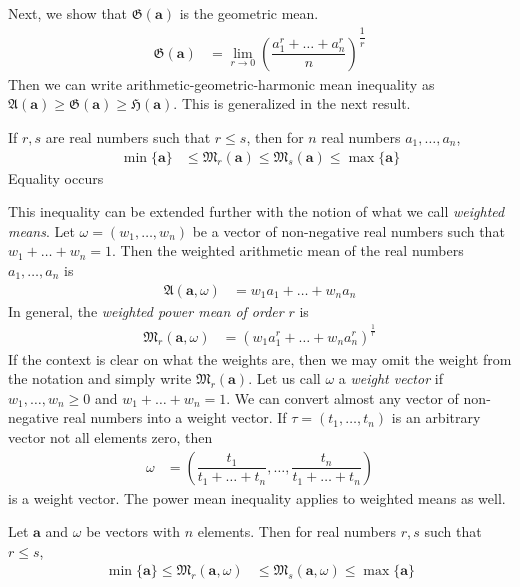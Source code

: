 \documentclass{subfile}
\begin{document}
	Next, we show that $\mathfrak{G}(\mathbf{a})$ is the geometric mean.
		\begin{align*}
			\mathfrak{G}(\mathbf{a})
				& = \lim\limits_{r\to0}\left(\dfrac{a_1^r+\ldots+a_n^r}{n}\right)^{\dfrac{1}{r}}
		\end{align*}
	Then we can write arithmetic-geometric-harmonic mean inequality as $\mathfrak{A}(\mathbf{a})\geq\mathfrak{G}(\mathbf{a})\geq \mathfrak{H}(\mathbf{a})$. This is generalized in the next result.
		\begin{theorem}
			If $r,s$ are real numbers such that $r\leq s$, then for $n$ real numbers $a_1,\ldots,a_n$,
				\begin{align*}
					\min\{\mathbf{a}\}
						& \leq \mathfrak{M}_r(\mathbf{a})\leq \mathfrak{M}_s(\mathbf{a})\leq\max\{\mathbf{a}\}
				\end{align*}
			Equality occurs 
		\end{theorem}
	This inequality can be extended further with the notion of what we call \textit{weighted means}. Let $\omega=(w_{1},\ldots,w_{n})$ be a vector of non-negative real numbers such that $w_{1}+\ldots+w_{n}=1$. Then the weighted arithmetic mean of the real numbers $a_{1},\ldots,a_{n}$ is
		\begin{align*}
			\mathfrak{A}(\mathbf{a},\omega)
				& = w_{1}a_{1}+\ldots+w_{n}a_{n}
		\end{align*}
	In general, the \textit{weighted power mean of order} $r$ is
		\begin{align*}
			\mathfrak{M}_{r}(\mathbf{a},\omega)
				& = \left(w_{1}a_{1}^{r}+\ldots+w_{n}a_{n}^{r}\right)^{\frac{1}{r}}
		\end{align*}
	If the context is clear on what the weights are, then we may omit the weight from the notation and simply write $\mathfrak{M}_{r}(\mathbf{a})$. Let us call $\omega$ a \textit{weight vector} if $w_{1},\ldots,w_{n}\geq 0$ and $w_{1}+\ldots+w_{n}=1$. We can convert almost any vector of non-negative real numbers into a weight vector. If $\tau=(t_{1},\ldots,t_{n})$ is an arbitrary vector not all elements zero, then
		\begin{align*}
			\omega
				& = \left(\dfrac{t_{1}}{t_{1}+\ldots+t_{n}},\ldots,\dfrac{t_{n}}{t_{1}+\ldots+t_{n}}\right)
		\end{align*}
	is a weight vector. The power mean inequality applies to weighted means as well.
		\begin{theorem}\label{thm:weightedpowermean}
			Let $\mathbf{a}$ and $\omega$ be vectors with $n$ elements. Then for real numbers $r,s$ such that $r\leq s$,
				\begin{align*}
					\min\{\mathbf{a}\} \leq \mathfrak{M}_{r}(\mathbf{a},\omega)
						& \leq \mathfrak{M}_{s}(\mathbf{a},\omega)\leq \max\{\mathbf{a}\}
				\end{align*}
		\end{theorem}
\end{document}
